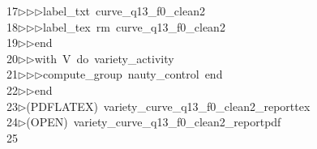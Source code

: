 \begin{tabbing}
17\>$\triangleright$\>$\triangleright$\>$\triangleright$\>label\_txt\ curve\_q13\_f0\_clean2\ \\[0pt]
18\>$\triangleright$\>$\triangleright$\>$\triangleright$\>label\_tex\ rm\ curve\_q13\_f0\_clean2\ \\[0pt]
19\>$\triangleright$\>$\triangleright$\>end\ \\[0pt]
20\>$\triangleright$\>$\triangleright$\>with\ V\ do\ variety\_activity\ \\[0pt]
21\>$\triangleright$\>$\triangleright$\>$\triangleright$\>compute\_group\ nauty\_control\ end\ \\[0pt]
22\>$\triangleright$\>$\triangleright$\>end\ \\[0pt]
23\>$\triangleright$\>(PDFLATEX)\ variety\_curve\_q13\_f0\_clean2\_reporttex\\[0pt]
24\>$\triangleright$\>(OPEN)\ variety\_curve\_q13\_f0\_clean2\_reportpdf\\[0pt]
25\>\end{tabbing}
